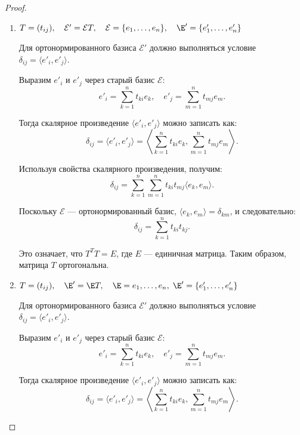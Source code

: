 \begin{proof}
    \leavevmode \nl  
    
    \begin{enumerate}
        \item  $ T = (t_{ij}), \quad \mathcal{E'} = \mathcal{E}T , \quad \mathcal{E} = \{e_{1}, \ldots, e_{n} \}, \quad \E' = \{e'_{1}, \ldots, e'_{n} \}$
        \nl 
        
        \quad Для ортонормированного базиса \( \mathcal{E}' \) должно выполняться условие \( \delta_{ij} = \langle e'_i, e'_j \rangle \).
        \nl
        
        \quad Выразим \( e'_i \) и \( e'_j \) через старый базис \( \mathcal{E} \):
        \[
        e'_i = \sum_{k=1}^n t_{ki} e_k, \quad e'_j = \sum_{m=1}^n t_{mj} e_m.
        \]
        \nl
        
        \quad Тогда скалярное произведение \( \langle e'_i, e'_j \rangle \) можно записать как:
        \[
        \delta_{ij} = \langle e'_i, e'_j \rangle = \left\langle \sum_{k=1}^n t_{ki} e_k, \sum_{m=1}^n t_{mj} e_m \right\rangle.
        \]
        \nl
        
        \quad Используя свойства скалярного произведения, получим:
        \[
        \delta_{ij} = \sum_{k=1}^n \sum_{m=1}^n t_{ki} t_{mj} \langle e_k, e_m \rangle.
        \]
        \nl
        
        \quad Поскольку \( \mathcal{E} \) — ортонормированный базис, \( \langle e_k, e_m \rangle = \delta_{km} \), и следовательно:
        \[
        \delta_{ij} = \sum_{k=1}^n t_{ki} t_{kj}.
        \]
        \nl
        
        \quad Это означает, что \( T^T T = E \), где \( E \) — единичная матрица. Таким образом, матрица \( T \) ортогональна.
        \nl 
    
        \item $ T = (t_{ij}), \quad \E' = \E T, \quad \E = {e_{1}, \ldots, e_{n}}, \; \E' = \{e'_{1}, \ldots, e'_{n}\} $
        \nl
        
        \quad Для ортонормированного базиса \( \mathcal{E}' \) должно выполняться условие \( \delta_{ij} = \langle e'_i, e'_j \rangle \).
        \nl
        
        \quad Выразим \( e'_i \) и \( e'_j \) через старый базис \( \mathcal{E} \):
        \[
        e'_i = \sum_{k=1}^n t_{ki} e_k, \quad e'_j = \sum_{m=1}^n t_{mj} e_m.
        \]
        \nl
        
        \quad Тогда скалярное произведение \( \langle e'_i, e'_j \rangle \) можно записать как:
        \[
        \delta_{ij} = \langle e'_i, e'_j \rangle = \left\langle \sum_{k=1}^n t_{ki} e_k, \sum_{m=1}^n t_{mj} e_m \right\rangle.
        \]
        \nl
        

\end{enumerate}
\end{proof}
